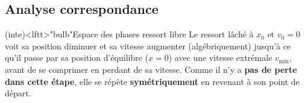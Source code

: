 \documentclass[../../main/main.tex]{subfiles}
\begin{document}
\subsection{Analyse correspondance}
\begin{tcb}[width=\linewidth, sidebyside, righthand ratio=.3]
	(inte)<lftt>"bulb"{Espace des phases ressort libre}
	Le ressort lâché à $x_0$ et $v_0=0$ voit sa position diminuer
	et sa vitesse augmenter (algébriquement) jusqu'à ce qu'il passe par sa
	position d'équilibre ($x=0$) avec une vitesse extrémale $v_{\min}$,
	avant de se comprimer en perdant de sa vitesse.
	\bigbreak
	Comme il n'y a
	\textbf{pas de perte dans cette étape}, elle se répète
	\textbf{symétriquement} en revenant à son point de départ.
	\tcblower
	\begin{center}
	\end{center}
\end{tcb}
\end{document}
